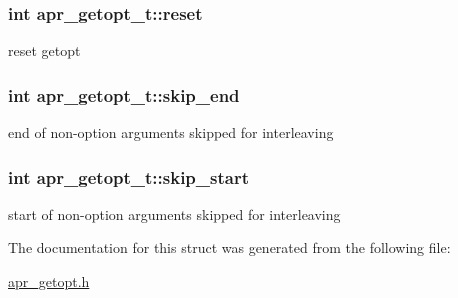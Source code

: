 \subsubsection[{\texorpdfstring{reset}{reset}}]{\setlength{\rightskip}{0pt plus 5cm}int apr\+\_\+getopt\+\_\+t\+::reset}\hypertarget{structapr__getopt__t_abc4e72bc761666c0b0d9015c3b0de8c3}{}\label{structapr__getopt__t_abc4e72bc761666c0b0d9015c3b0de8c3}
reset getopt 
\subsubsection[{\texorpdfstring{skip\+\_\+end}{skip_end}}]{\setlength{\rightskip}{0pt plus 5cm}int apr\+\_\+getopt\+\_\+t\+::skip\+\_\+end}\hypertarget{structapr__getopt__t_ae9e7e6eb1576820c7dc6e589cc3a28b7}{}\label{structapr__getopt__t_ae9e7e6eb1576820c7dc6e589cc3a28b7}
end of non-\/option arguments skipped for interleaving 
\subsubsection[{\texorpdfstring{skip\+\_\+start}{skip_start}}]{\setlength{\rightskip}{0pt plus 5cm}int apr\+\_\+getopt\+\_\+t\+::skip\+\_\+start}\hypertarget{structapr__getopt__t_a0cd41eedf9ed82bf5d9dcc3491ee67dd}{}\label{structapr__getopt__t_a0cd41eedf9ed82bf5d9dcc3491ee67dd}
start of non-\/option arguments skipped for interleaving 

The documentation for this struct was generated from the following file\+:\begin{DoxyCompactItemize}
\item 
\hyperlink{apr__getopt_8h}{apr\+\_\+getopt.\+h}\end{DoxyCompactItemize}
